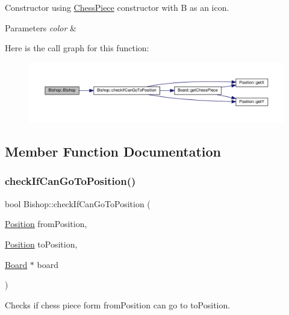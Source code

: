 Constructor using \hyperlink{classChessPiece}{Chess\+Piece} constructor with \textquotesingle{}B\textquotesingle{} as an icon. 


\begin{DoxyParams}{Parameters}
{\em color} & \\
\hline
\end{DoxyParams}
Here is the call graph for this function\+:
\nopagebreak
\begin{figure}[H]
\begin{center}
\leavevmode
\includegraphics[width=350pt]{classBishop_aaf9a04edcd25bfb97b86d6c5806e2b16_cgraph}
\end{center}
\end{figure}


\subsection{Member Function Documentation}
\mbox{\label{classBishop_aa9bdacc00fdb3a19035494e67240c55b}} 
\subsubsection{\texorpdfstring{check\+If\+Can\+Go\+To\+Position()}{checkIfCanGoToPosition()}}
{\footnotesize\ttfamily bool Bishop\+::check\+If\+Can\+Go\+To\+Position (\begin{DoxyParamCaption}\item[{\hyperlink{classPosition}{Position}}]{from\+Position,  }\item[{\hyperlink{classPosition}{Position}}]{to\+Position,  }\item[{\hyperlink{classBoard}{Board} $\ast$}]{board }\end{DoxyParamCaption})\hspace{0.3cm}{\ttfamily [virtual]}}



Checks if chess piece form from\+Position can go to to\+Position. 


